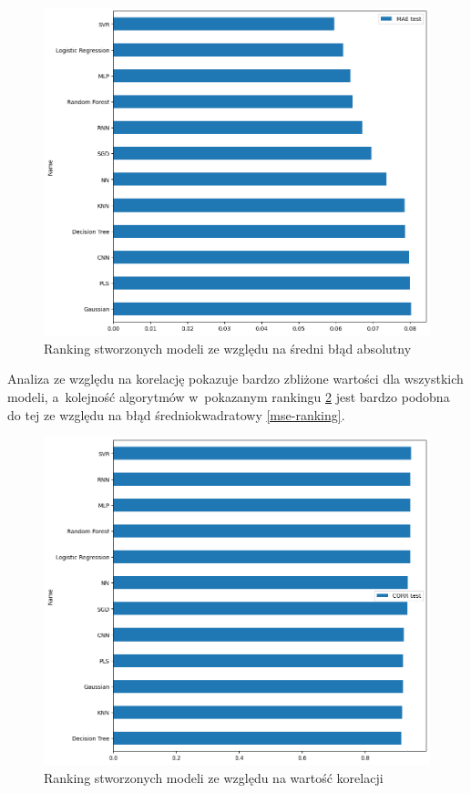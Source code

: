 \begin{figure}[H]
    \centering
    \includegraphics[width=\textwidth]{images/mae_ranking.png}
    \caption{Ranking stworzonych modeli ze względu na średni błąd absolutny}
    \label{mae-ranking}
\end{figure}

Analiza ze względu na korelację pokazuje bardzo zbliżone wartości dla wszystkich 
modeli, a~kolejność algorytmów w~pokazanym rankingu \ref{corr-ranking} jest 
bardzo podobna do tej ze względu na błąd średniokwadratowy \ref{mse-ranking}.

\begin{figure}[H]
    \centering
    \includegraphics[width=\textwidth]{images/corr_ranking.png}
    \caption{Ranking stworzonych modeli ze względu na wartość korelacji}
    \label{corr-ranking}
\end{figure}

